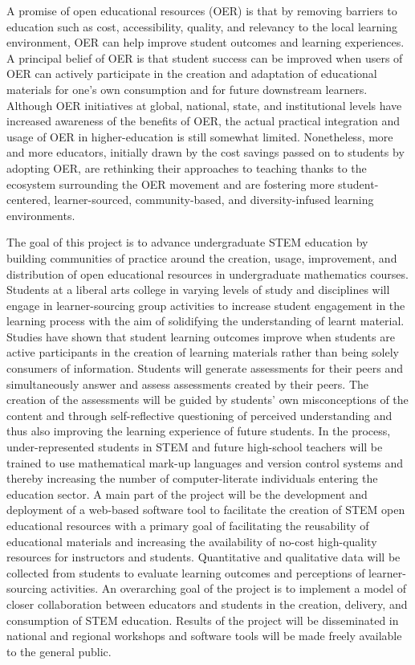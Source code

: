 \documentclass[11pt]{article}
\begin{document}
A promise of open educational resources (OER) is that by removing barriers to education such as cost, accessibility, quality, and relevancy to the local learning environment, OER can help improve student outcomes and learning experiences.  A principal belief of OER is that student success can be improved when users of OER can actively participate in the creation and adaptation of educational materials for one's own consumption and for future downstream learners.  Although OER initiatives at global, national, state, and institutional levels have increased awareness of the benefits of OER, the actual practical integration and usage of OER in higher-education is still somewhat limited.  Nonetheless, more and more educators, initially drawn by the cost savings passed on to students by adopting OER, are rethinking their approaches to teaching thanks to the ecosystem surrounding the OER movement and are fostering more student-centered, learner-sourced, community-based, and diversity-infused learning environments.

The goal of this project is to advance undergraduate STEM education by building communities of practice around the creation, usage, improvement, and distribution of open educational resources in undergraduate mathematics courses.  Students at a liberal arts college in varying levels of study and disciplines will engage in learner-sourcing group activities to increase student engagement in the learning process with the aim of solidifying the understanding of learnt material.  Studies have shown that student learning outcomes improve when students are active participants in the creation of learning materials rather than being solely consumers of information.  Students will generate assessments for their peers and simultaneously answer and assess assessments created by their peers. The creation of the assessments will be guided by students' own misconceptions of the content and through self-reflective questioning of perceived understanding and thus also improving the learning experience of future students.  In the process, under-represented students in STEM and future high-school teachers will be trained to use mathematical mark-up languages and version control systems and thereby increasing the number of computer-literate individuals entering the education sector.  A main part of the project will be the development and deployment of a web-based software tool to facilitate the creation of STEM open educational resources with a primary goal of facilitating the reusability of educational materials and increasing the availability of no-cost high-quality resources for instructors and students.  Quantitative and qualitative data will be collected from students to evaluate learning outcomes and perceptions of learner-sourcing activities.  An overarching goal of the project is to implement a model of closer collaboration between educators and students in the creation, delivery, and consumption of STEM education.  Results of the project will be disseminated in national and regional workshops and software tools will be made freely available to the general public.
\end{document}
